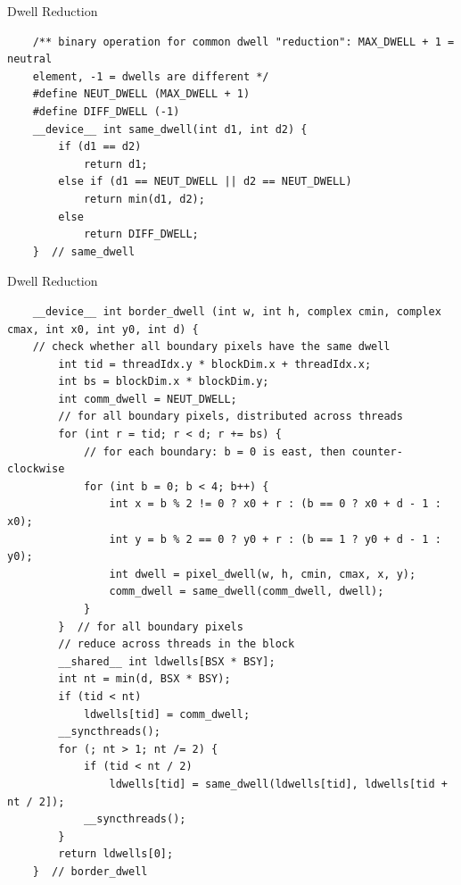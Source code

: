 \documentclass[fleqn,11pt,aspectratio=43]{beamer}
\begin{document}
\begin{frame}[fragile]{Dwell Reduction}
	\begin{verbatim}
	/** binary operation for common dwell "reduction": MAX_DWELL + 1 = neutral
	element, -1 = dwells are different */
	#define NEUT_DWELL (MAX_DWELL + 1)
	#define DIFF_DWELL (-1)
	__device__ int same_dwell(int d1, int d2) {
		if (d1 == d2)
			return d1;
		else if (d1 == NEUT_DWELL || d2 == NEUT_DWELL)
			return min(d1, d2);
		else
			return DIFF_DWELL;
	}  // same_dwell
	\end{verbatim}
\end{frame}

\begin{frame}[fragile]{Dwell Reduction}
	\begin{verbatim}
	__device__ int border_dwell (int w, int h, complex cmin, complex cmax, int x0, int y0, int d) {
	// check whether all boundary pixels have the same dwell
		int tid = threadIdx.y * blockDim.x + threadIdx.x;
		int bs = blockDim.x * blockDim.y;
		int comm_dwell = NEUT_DWELL;
		// for all boundary pixels, distributed across threads
		for (int r = tid; r < d; r += bs) {
			// for each boundary: b = 0 is east, then counter-clockwise
			for (int b = 0; b < 4; b++) {
				int x = b % 2 != 0 ? x0 + r : (b == 0 ? x0 + d - 1 : x0);
				int y = b % 2 == 0 ? y0 + r : (b == 1 ? y0 + d - 1 : y0);
				int dwell = pixel_dwell(w, h, cmin, cmax, x, y);
				comm_dwell = same_dwell(comm_dwell, dwell);
			}
		}  // for all boundary pixels
		// reduce across threads in the block
		__shared__ int ldwells[BSX * BSY];
		int nt = min(d, BSX * BSY);
		if (tid < nt)
			ldwells[tid] = comm_dwell;
		__syncthreads();
		for (; nt > 1; nt /= 2) {
			if (tid < nt / 2)
				ldwells[tid] = same_dwell(ldwells[tid], ldwells[tid + nt / 2]);
			__syncthreads();
		}
		return ldwells[0];
	}  // border_dwell
	\end{verbatim}
\end{frame}
\end{document}
